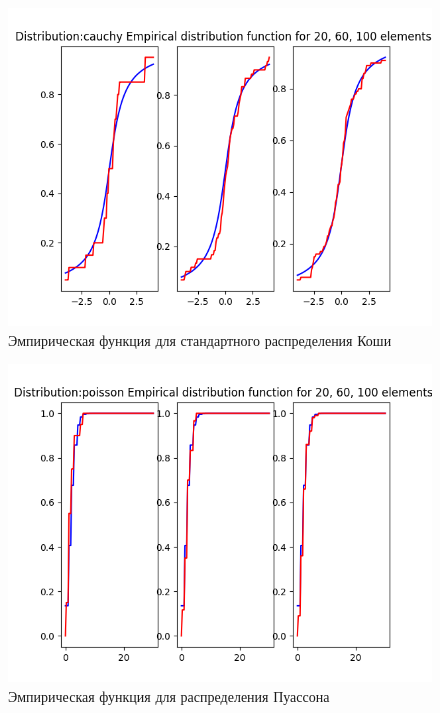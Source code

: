 \documentclass[12pt]{article}
\begin{document}
\begin{center}
\begin{figure}[H]
\caption{Эмпирическая функция для стандартного распределения Коши }
\includegraphics[width=\textwidth]{empiric/cauchy.png} 
\end{figure}

\begin{figure}[H]
\caption{Эмпирическая функция для распределения Пуассона }
\includegraphics[width=\textwidth]{empiric/poisson.png} 
\end{figure}


\end{center}
\end{document}
